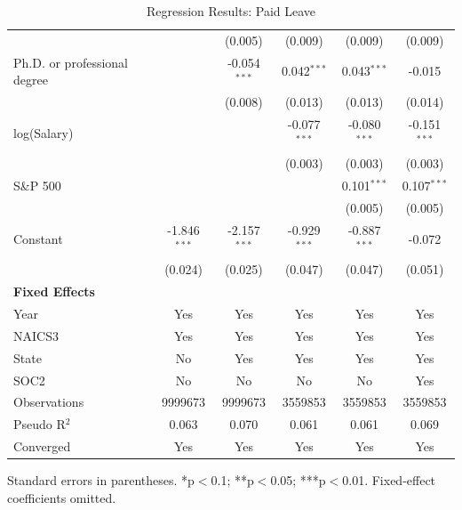 \begin{table}[!htbp]
\begin{tabular}{lccccc}
 &  & (0.005) & (0.009) & (0.009) & (0.009) \\
Ph.D. or professional degree &  & -0.054$^{***}$ & 0.042$^{***}$ & 0.043$^{***}$ & -0.015 \\
 &  & (0.008) & (0.013) & (0.013) & (0.014) \\
log(Salary) &  &  & -0.077$^{***}$ & -0.080$^{***}$ & -0.151$^{***}$ \\
 &  &  & (0.003) & (0.003) & (0.003) \\
S\&P 500 &  &  &  & 0.101$^{***}$ & 0.107$^{***}$ \\
 &  &  &  & (0.005) & (0.005) \\
Constant & -1.846$^{***}$ & -2.157$^{***}$ & -0.929$^{***}$ & -0.887$^{***}$ & -0.072 \\
 & (0.024) & (0.025) & (0.047) & (0.047) & (0.051) \\
\midrule
\textbf{Fixed Effects} &  &  &  &  &  \\
Year & Yes & Yes & Yes & Yes & Yes \\
NAICS3 & Yes & Yes & Yes & Yes & Yes \\
State & No & Yes & Yes & Yes & Yes \\
SOC2 & No & No & No & No & Yes \\
Observations & 9999673 & 9999673 & 3559853 & 3559853 & 3559853 \\
Pseudo R$^2$ & 0.063 & 0.070 & 0.061 & 0.061 & 0.069 \\
Converged & Yes & Yes & Yes & Yes & Yes \\
\bottomrule
\end{tabular}
\caption{Regression Results: Paid Leave}
\par\smallskip\scriptsize Standard errors in parentheses. *p$<$0.1; **p$<$0.05; ***p$<$0.01. Fixed-effect coefficients omitted.
\end{table}